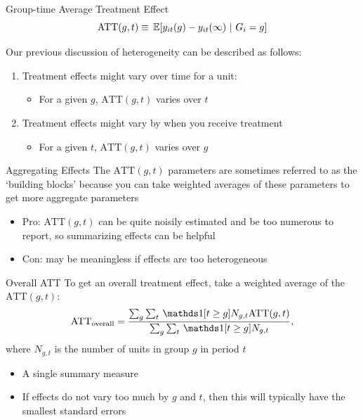 \documentclass[aspectratio=169,t,11pt,table]{beamer}
\begin{document}
\begin{frame}{Group-time Average Treatment Effect}
  \vspace*{-\bigskipamount}
  $$
    \text{ATT}(g, t) \equiv \expec{y_{it}(g) - y_{it}(\infty)}{G_i = g}
  $$
  
  \bigskip
  Our previous discussion of heterogeneity can be described as follows:

  \bigskip
  \begin{enumerate}
    \item Treatment effects might vary over time for a unit:
    \begin{itemize}
      \item For a given $g$, $\text{ATT}(g, t)$ varies over $t$
    \end{itemize}
    
    \bigskip
    \item Treatment effects might vary by when you receive treatment
    \begin{itemize}
      \item For a given $t$, $\text{ATT}(g, t)$ varies over $g$
    \end{itemize}
  \end{enumerate}
\end{frame}

\begin{frame}{Aggregating Effects}
  The $\text{ATT}(g, t)$ parameters are sometimes referred to as the `building blocks' because you can take weighted averages of these parameters to get more aggregate parameters
  \begin{itemize}
    \item Pro: $\text{ATT}(g,t)$ can be quite noisily estimated and be too numerous to report, so summarizing effects can be helpful 
    
    \item Con: may be meaningless if effects are too heterogeneous
  \end{itemize}
\end{frame}

\begin{frame}{Overall ATT}
  To get an overall treatment effect, take a weighted average of the $\text{ATT}(g, t)$:
  $$
    \text{ATT}_{\text{overall}} =
    \frac{\sum_{g} \sum_{t} \one{t \geq g} N_{g,t} \text{ATT}(g, t)}
    {\sum_{g} \sum_{t} \one{t \geq g} N_{g,t}},
  $$
  where $N_{g,t}$ is the number of units in group $g$ in period $t$

  \pause
  \bigskip
  \begin{itemize}
    \item A single summary measure

    \item If effects do not vary too much by $g$ and $t$, then this will typically have the smallest standard errors
  \end{itemize}
\end{frame}
\end{document}
